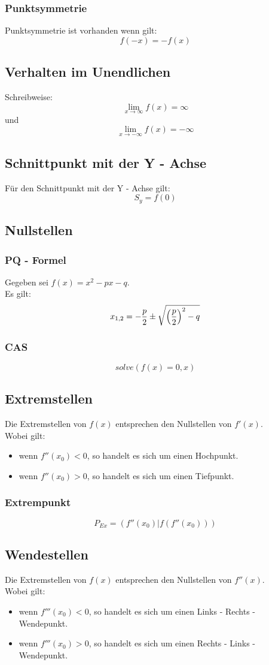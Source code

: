 \documentclass[a4paper,12pt]{article}
\begin{document}
\subsubsection{Punktsymmetrie}
Punktsymmetrie ist vorhanden wenn gilt:
$$f(-x) = -f(x)$$
\subsection{Verhalten im Unendlichen}
Schreibweise:
\[\lim_{x \to \infty} f(x) = \infty\]
und
\[\lim_{x \to -\infty} f(x) = -\infty\]
\subsection{Schnittpunkt mit der Y - Achse}
Für den Schnittpunkt mit der Y - Achse gilt:
$$S_y = f(0)$$
\subsection{Nullstellen}
\subsubsection{PQ - Formel}
Gegeben sei $f(x) = x^2 - px - q$.\\
Es gilt:
$$x_{1,2} = - \frac{p}{2} \pm \sqrt{\Big{(}\frac{p}{2}\Big{)}^2 - q}$$
\subsubsection{CAS}
$$solve(f(x) = 0, x)$$
\subsection{Extremstellen}
Die Extremstellen von $f(x)$ entsprechen den Nullstellen von $f'(x)$.\\
Wobei gilt:
\begin{itemize}
\item wenn $f''(x_0) < 0$, so handelt es sich um einen Hochpunkt.
\item wenn $f''(x_0) > 0$, so handelt es sich um einen Tiefpunkt.
\end{itemize}
\subsubsection{Extrempunkt}
$$P_{Ex} = (f''(x_0) | f(f''(x_0)))$$
\subsection{Wendestellen}
Die Extremstellen von $f(x)$ entsprechen den Nullstellen von $f''(x)$.\\
Wobei gilt:
\begin{itemize}
\item wenn $f'''(x_0) < 0$, so handelt es sich um einen Links - Rechts - Wendepunkt.
\item wenn $f'''(x_0) > 0$, so handelt es sich um einen Rechts - Links - Wendepunkt.
\end{itemize}
\end{document}
